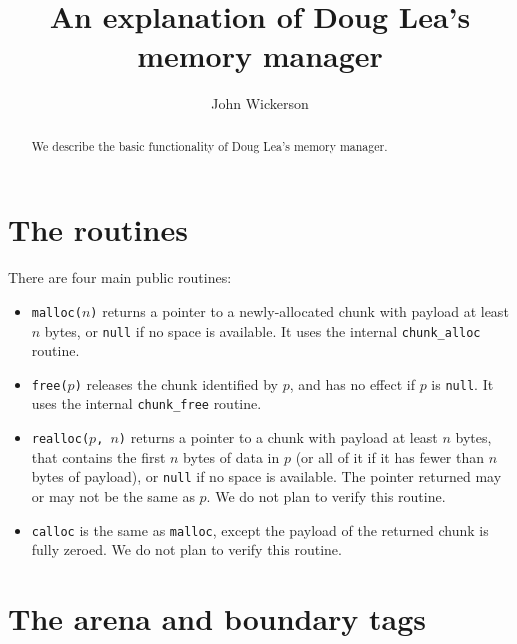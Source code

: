 \documentclass[12pt,a4paper]{article}
\title{An explanation of Doug Lea's memory manager}
\author{John Wickerson}
\date{}
\theoremstyle{remark}
\begin{document}
\maketitle

\begin{abstract}
We describe the basic functionality of Doug Lea's memory manager.
\end{abstract}

\section{The routines}

There are four main public routines:

\begin{itemize}
\item {\tt malloc($n$)} returns a pointer to a newly-allocated chunk with payload at least $n$ bytes, or {\tt null} if no space is available. It uses the internal {\tt chunk\_alloc} routine.
\item {\tt free($p$)} releases the chunk identified by $p$, and has no effect if $p$ is {\tt null}. It uses the internal {\tt chunk\_free} routine.
\item {\tt realloc($p$, $n$)} returns a pointer to a chunk with payload at least $n$ bytes, that contains the first $n$ bytes of data in $p$ (or all of it if it has fewer than $n$ bytes of payload), or {\tt null} if no space is available. The pointer returned may or may not be the same as $p$. We do not plan to verify this routine.
\item {\tt calloc} is the same as {\tt malloc}, except the payload of the returned chunk is fully zeroed. We do not plan to verify this routine.
\end{itemize}

\section{The arena and boundary tags}
\end{document}
